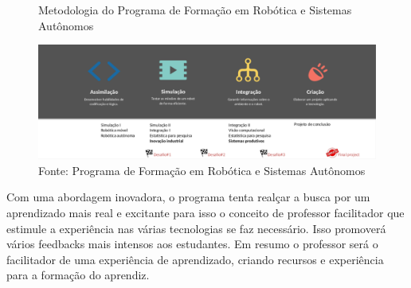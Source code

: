 \begin{figure}[H]
    \caption{Metodologia do Programa de Formação em Robótica e Sistemas Autônomos}
    \centering
    \includegraphics[width= \textwidth]{Figures/metodologia.png}
    \caption*{Fonte: Programa de Formação em Robótica e Sistemas Autônomos}
    \label{fig:metodologia}
\end{figure}

Com uma abordagem inovadora, o programa tenta realçar a busca por um aprendizado mais real e excitante para isso o conceito de professor facilitador que estimule a experiência nas várias tecnologias se faz necessário. Isso promoverá vários feedbacks mais intensos aos estudantes. Em resumo o professor será o facilitador de uma experiência de aprendizado, criando recursos e experiência para a formação do aprendiz.




